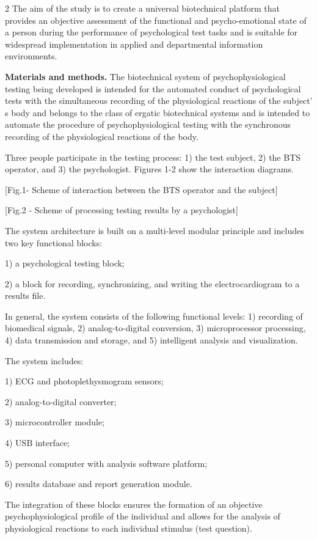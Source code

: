 \begin{multicols}{2}
The aim of the study is to create a universal biotechnical platform that
provides an objective assessment of the functional and psycho-emotional
state of a person during the performance of psychological test tasks and
is suitable for widespread implementation in applied and departmental
information environments.

{\bfseries Materials and methods.} The biotechnical system of
psychophysiological testing being developed is intended for the
automated conduct of psychological tests with the simultaneous recording
of the physiological reactions of the subject' s body and
belongs to the class of ergatic biotechnical systems and is intended to
automate the procedure of psychophysiological testing with the
synchronous recording of the physiological reactions of the body.

Three people participate in the testing process: 1) the test subject, 2)
the BTS operator, and 3) the psychologist. Figures 1-2 show the
interaction diagrams.

[Fig.1- Scheme of interaction between the BTS operator and the
subject]

[Fig.2 - Scheme of processing testing results by a psychologist]

The system architecture is built on a multi-level modular principle and
includes two key functional blocks:

1) a psychological testing block;

2) a block for recording, synchronizing, and writing the
electrocardiogram to a results file.

In general, the system consists of the following functional levels: 1)
recording of biomedical signals, 2) analog-to-digital conversion, 3)
microprocessor processing, 4) data transmission and storage, and 5)
intelligent analysis and visualization.

The system includes:

1) ECG and photoplethysmogram sensors;

2) analog-to-digital converter;

3) microcontroller module;

4) USB interface;

5) personal computer with analysis software platform;

6) results database and report generation module.

The integration of these blocks ensures the formation of an objective
psychophysiological profile of the individual and allows for the
analysis of physiological reactions to each individual stimulus (test
question).


\end{multicols}
